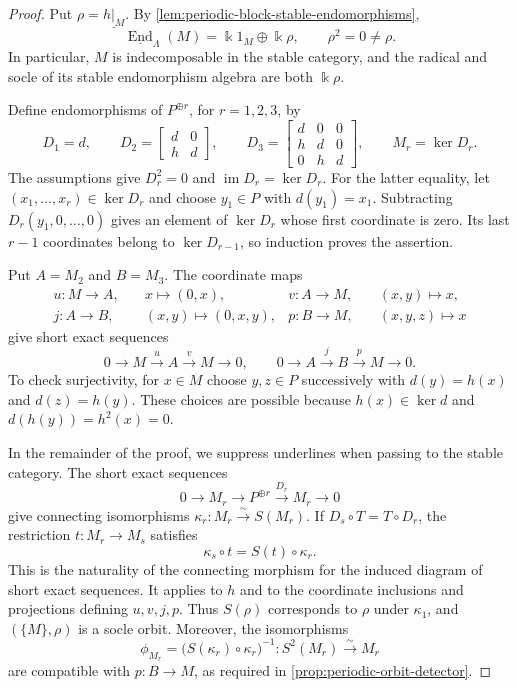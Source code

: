 \documentclass[a4paper,11pt,reqno]{amsart}
\theoremstyle{definition}
\theoremstyle{plain}
\numberwithin{equation}{section}
\newcommand{\im}{\operatorname{im}}
\newcommand{\End}{\operatorname{End}}
\newcommand{\kk}{\Bbbk}
\begin{document}
\begin{proof}
Put \(\rho=\underline{h|_M}\).  By
\cref{lem:periodic-block-stable-endomorphisms},
\[
 \underline{\End}_\Lambda(M)=\kk1_M\oplus\kk\rho,
 \qquad \rho^2=0\ne\rho.
\]
In particular, \(M\) is indecomposable in the stable category, and
the radical and socle of its stable endomorphism algebra are both
\(\kk\rho\).

Define endomorphisms of \(P^{\oplus r}\), for \(r=1,2,3\), by
\[
 D_1=d,\qquad
 D_2=\begin{bmatrix}d&0\\h&d\end{bmatrix},\qquad
 D_3=\begin{bmatrix}d&0&0\\h&d&0\\0&h&d\end{bmatrix},
 \qquad M_r=\ker D_r.
\]
The assumptions give \(D_r^2=0\) and \(\im D_r=\ker D_r\).
For the latter equality, let \((x_1,\ldots,x_r)\in\ker D_r\)
and choose \(y_1\in P\) with \(d(y_1)=x_1\).
Subtracting \(D_r(y_1,0,\ldots,0)\) gives an element of
\(\ker D_r\) whose first coordinate is zero.  Its last
\(r-1\) coordinates belong to \(\ker D_{r-1}\), so induction
proves the assertion.

Put \(A=M_2\) and \(B=M_3\).  The coordinate maps
\[
\begin{aligned}
 u:M\to A,&\quad x\longmapsto(0,x),&
 v:A\to M,&\quad(x,y)\longmapsto x,\\
 j:A\to B,&\quad(x,y)\longmapsto(0,x,y),&
 p:B\to M,&\quad(x,y,z)\longmapsto x
\end{aligned}
\]
give short exact sequences
\begin{equation}
\label{eq:ade-periodic-rows}
 0\longrightarrow M\xrightarrow{u}A\xrightarrow{v}M
 \longrightarrow0,\qquad
 0\longrightarrow A\xrightarrow{j}B\xrightarrow{p}M
 \longrightarrow0.
\end{equation}
To check surjectivity, for \(x\in M\) choose \(y,z\in P\)
successively with \(d(y)=h(x)\) and \(d(z)=h(y)\).
These choices are possible because \(h(x)\in\ker d\) and
\(d(h(y))=h^2(x)=0\).

In the remainder of the proof, we suppress underlines when passing
to the stable category.  The short exact sequences
\[
 0\longrightarrow M_r\longrightarrow P^{\oplus r}
 \xrightarrow{D_r}M_r\longrightarrow0
\]
give connecting isomorphisms
\(\kappa_r:M_r\xrightarrow{\sim}S(M_r)\).
If \(D_s\circ T=T\circ D_r\), the restriction
\(t:M_r\to M_s\) satisfies
\begin{equation}
\label{eq:ade-period-naturality}
 \kappa_s\circ t=S(t)\circ\kappa_r.
\end{equation}
This is the naturality of the connecting morphism for the induced
diagram of short exact sequences.  It applies to \(h\) and to
the coordinate inclusions and projections defining \(u,v,j,p\).
Thus \(S(\rho)\) corresponds to \(\rho\) under \(\kappa_1\),
and \((\{M\},\rho)\) is a socle orbit.
Moreover, the isomorphisms
\[
 \phi_{M_r}=
 \bigl(S(\kappa_r)\circ\kappa_r\bigr)^{-1}:
 S^2(M_r)\xrightarrow{\sim}M_r
\]
are compatible with \(p:B\to M\), as required in
\cref{prop:periodic-orbit-detector}.


\end{proof}
\end{document}
